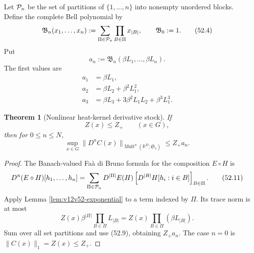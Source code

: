 \documentclass[11pt]{article}
\newtheorem{theorem}{Theorem}[section]
\theoremstyle{remark}
\begin{document}
Let \({\cal P}_n\) be the set of partitions of
\(\{1,\ldots,n\}\) into nonempty unordered blocks.  Define the
complete Bell polynomial by
\begin{equation}
 {\mathfrak B}_n(x_1,\ldots,x_n)
 :=
 \sum_{\Pi\in{\cal P}_n}
 \prod_{B\in\Pi}x_{|B|},
 \qquad {\mathfrak B}_0:=1.                      \tag{52.4}
\end{equation}
Put
\begin{equation}
                         a_n:=
 {\mathfrak B}_n(\beta L_1,\ldots,\beta L_n).
                                                        \tag{52.5}
\end{equation}
The first values are
\begin{align}
 a_1&=\beta L_1,                                  \tag{52.6}\\
 a_2&=\beta L_2+\beta^2L_1^2,                    \tag{52.7}\\
 a_3&=\beta L_3+3\beta^2L_1L_2+\beta^3L_1^3.     \tag{52.8}
\end{align}

\begin{theorem}[Nonlinear heat-kernel derivative stock]
\label{thm:v12v52-heat-stock}
If
\begin{equation}
                         Z(x)\leq Z_+
 \qquad(x\in G),                                  \tag{52.9}
\end{equation}
then for \(0\leq n\leq N\),
\begin{equation}
 \sup_{x\in G}
 \|D^nC(x)\|_{\operatorname{Mult}^n
  (\mathbb R^D;{\mathfrak S}_1)}
 \leq Z_+a_n.                                    \tag{52.10}
\end{equation}
\end{theorem}

\begin{proof}
The Banach-valued Fa\`a di Bruno formula for the composition
\(E\circ H\) is
\begin{equation}
 D^n(E\circ H)[h_1,\ldots,h_n]
 =
 \sum_{\Pi\in{\cal P}_n}
 D^{|\Pi|}E(H)
 \left[
 D^{|B|}H[h_i:i\in B]
 \right]_{B\in\Pi}.                              \tag{52.11}
\end{equation}
Apply Lemma \ref{lem:v12v52-exponential} to a term indexed by
\(\Pi\).  Its trace norm is at most
\[
 Z(x)\beta^{|\Pi|}
 \prod_{B\in\Pi}L_{|B|}
 =
 Z(x)\prod_{B\in\Pi}(\beta L_{|B|}).
\]
Sum over all set partitions and use (52.9), obtaining
\(Z_+a_n\).  The case \(n=0\) is
\(\|C(x)\|_1=Z(x)\leq Z_+\).
\end{proof}
\end{document}
